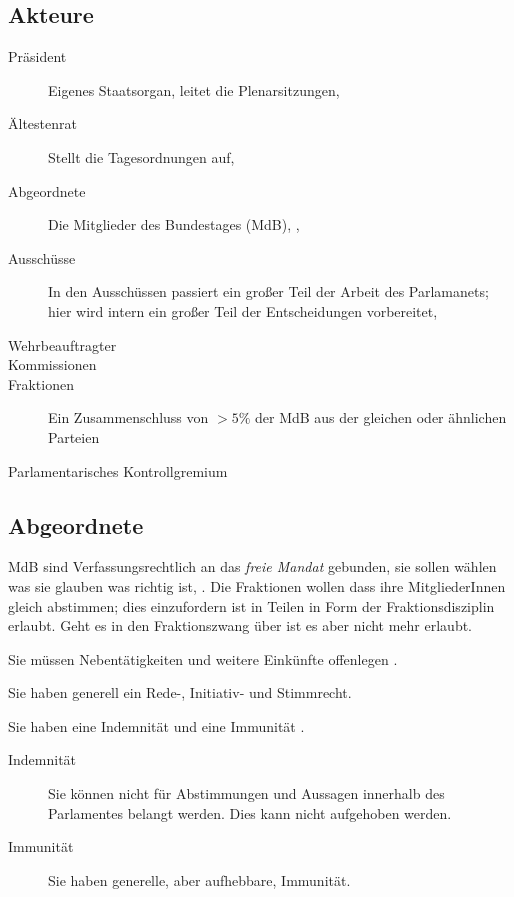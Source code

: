 \documentclass{article}
\begin{document}
\subsection{Akteure}
\begin{description}
 \item[Präsident] Eigenes Staatsorgan, leitet die Plenarsitzungen, \GG
 \item[Ältestenrat] Stellt die Tagesordnungen auf, \GOBT
 \item[Abgeordnete] Die Mitglieder des Bundestages (MdB), \GG, \GOBT
 \item[Ausschüsse] In den Ausschüssen passiert ein großer Teil der Arbeit des Parlamanets; hier wird intern ein großer Teil der Entscheidungen vorbereitet, \GG \GOBT 
 \item[Wehrbeauftragter] \GG \GOBT 
 \item[Kommissionen] \GOBT
 \item[Fraktionen] Ein Zusammenschluss von $>5\%$ der MdB aus der gleichen oder ähnlichen Parteien \GOBT
 \item[Parlamentarisches Kontrollgremium] \GG 
\end{description}

\subsection{Abgeordnete}
MdB sind Verfassungsrechtlich an das \emph{freie Mandat} gebunden, sie sollen wählen was sie glauben was richtig ist,  \GG. Die Fraktionen wollen dass ihre MitgliederInnen gleich abstimmen; dies einzufordern ist in Teilen in Form der Fraktionsdisziplin erlaubt. Geht es in den Fraktionszwang über ist es aber nicht mehr erlaubt.

Sie müssen Nebentätigkeiten und weitere Einkünfte offenlegen  .

Sie haben generell ein Rede-, Initiativ- und Stimmrecht.

Sie haben eine Indemnität und eine Immunität  \GG.
\begin{description}
 \item[Indemnität] Sie können nicht für Abstimmungen und Aussagen innerhalb des Parlamentes belangt werden. Dies kann nicht aufgehoben werden.
 \item[Immunität] Sie haben generelle, aber aufhebbare, Immunität.
\end{description}
\end{document}
